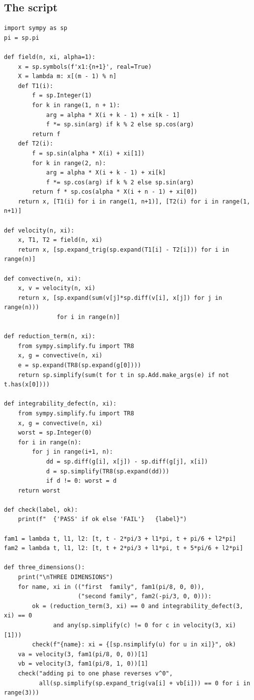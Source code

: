 \documentclass[11pt]{jfm}
\numberwithin{equation}{section}
\begin{document}
\subsection*{The script}
\begingroup
\small
\begingroup\small\begin{verbatim}
import sympy as sp
pi = sp.pi

def field(n, xi, alpha=1):
    x = sp.symbols(f'x1:{n+1}', real=True)
    X = lambda m: x[(m - 1) % n]
    def T1(i):
        f = sp.Integer(1)
        for k in range(1, n + 1):
            arg = alpha * X(i + k - 1) + xi[k - 1]
            f *= sp.sin(arg) if k % 2 else sp.cos(arg)
        return f
    def T2(i):
        f = sp.sin(alpha * X(i) + xi[1])
        for k in range(2, n):
            arg = alpha * X(i + k - 1) + xi[k]
            f *= sp.cos(arg) if k % 2 else sp.sin(arg)
        return f * sp.cos(alpha * X(i + n - 1) + xi[0])
    return x, [T1(i) for i in range(1, n+1)], [T2(i) for i in range(1, n+1)]

def velocity(n, xi):
    x, T1, T2 = field(n, xi)
    return x, [sp.expand_trig(sp.expand(T1[i] - T2[i])) for i in range(n)]

def convective(n, xi):
    x, v = velocity(n, xi)
    return x, [sp.expand(sum(v[j]*sp.diff(v[i], x[j]) for j in range(n)))
               for i in range(n)]

def reduction_term(n, xi):
    from sympy.simplify.fu import TR8
    x, g = convective(n, xi)
    e = sp.expand(TR8(sp.expand(g[0])))
    return sp.simplify(sum(t for t in sp.Add.make_args(e) if not t.has(x[0])))

def integrability_defect(n, xi):
    from sympy.simplify.fu import TR8
    x, g = convective(n, xi)
    worst = sp.Integer(0)
    for i in range(n):
        for j in range(i+1, n):
            dd = sp.diff(g[i], x[j]) - sp.diff(g[j], x[i])
            d = sp.simplify(TR8(sp.expand(dd)))
            if d != 0: worst = d
    return worst

def check(label, ok):
    print(f"  {'PASS' if ok else 'FAIL'}   {label}")

fam1 = lambda t, l1, l2: [t, t - 2*pi/3 + l1*pi, t + pi/6 + l2*pi]
fam2 = lambda t, l1, l2: [t, t + 2*pi/3 + l1*pi, t + 5*pi/6 + l2*pi]

def three_dimensions():
    print("\nTHREE DIMENSIONS")
    for name, xi in (("first  family", fam1(pi/8, 0, 0)),
                     ("second family", fam2(-pi/3, 0, 0))):
        ok = (reduction_term(3, xi) == 0 and integrability_defect(3, xi) == 0
              and any(sp.simplify(c) != 0 for c in velocity(3, xi)[1]))
        check(f"{name}: xi = {[sp.nsimplify(u) for u in xi]}", ok)
    va = velocity(3, fam1(pi/8, 0, 0))[1]
    vb = velocity(3, fam1(pi/8, 1, 0))[1]
    check("adding pi to one phase reverses v^0",
          all(sp.simplify(sp.expand_trig(va[i] + vb[i])) == 0 for i in range(3)))


\end{verbatim}
\end{document}

